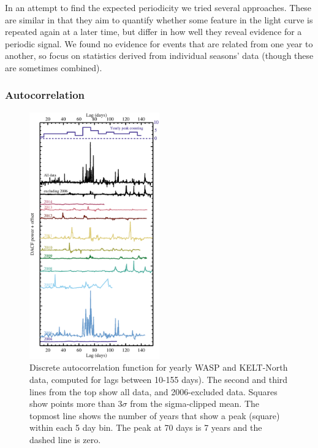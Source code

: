 \documentclass[useAMS,usenatbib,usegraphicx]{mn2e}
\begin{document}
In an attempt to find the expected periodicity we tried several approaches. These are
similar in that they aim to quantify whether some feature in the light curve is repeated
again at a later time, but differ in how well they reveal evidence for a periodic
signal. We found no evidence for events that are related from one year to another, so
focus on statistics derived from individual seasons' data (though these are sometimes
combined).

\subsubsection{Autocorrelation}\label{sss:auto}

\begin{figure}
\begin{center}
\hspace{-0.5cm} \includegraphics[width=0.5\textwidth]{figs/auto.eps}
\caption{Discrete autocorrelation function for yearly WASP and KELT-North data, computed for
  lags between 10-155 days). The second and third lines from the top show all data, and
  2006-excluded data. Squares show points more than 3$\sigma$ from the sigma-clipped
  mean. The topmost line shows the number of years that show a peak (square) within each
  5 day bin. The peak at 70 days is 7 years and the dashed line is zero.}\label{fig:auto}
\end{center}
\end{figure}
\end{document}
